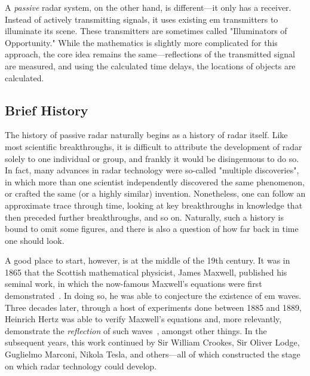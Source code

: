 \documentclass[class=report,11pt,crop=false]{standalone}
\begin{document}
A \emph{passive} radar system, on the other hand, is different---it only has a receiver. Instead of actively transmitting signals, it uses existing \gls{em} transmitters to illuminate its scene. These transmitters are sometimes called "Illuminators of Opportunity." While the mathematics is slightly more complicated for this approach, the core idea remains the same---reflections of the transmitted signal are measured, and using the calculated time delays, the locations of objects are calculated.

\subsection{Brief History}
The history of passive radar naturally begins as a history of radar itself. Like most scientific breakthroughs, it is difficult to attribute the development of radar solely to one individual or group, and frankly it would be disingenuous to do so. In fact, many advances in radar technology were so-called "multiple discoveries", in which more than one scientist independently discovered the same phenomenon, or crafted the same (or a highly similar) invention. Nonetheless, one can follow an approximate trace through time, looking at key breakthroughs in knowledge that then preceded further breakthroughs, and so on. Naturally, such a history is bound to omit some figures, and there is also a question of how far back in time one should look.

A good place to start, however, is at the middle of the 19th century. It was in 1865 that the Scottish mathematical physicist, James Maxwell, published his seminal work, in which the now-famous Maxwell's equations were first demonstrated~\cite{maxwell1865viii}. In doing so, he was able to conjecture the existence of \gls{em} waves. Three decades later, through a host of experiments done between 1885 and 1889, Heinrich Hertz was able to verify Maxwell's equations and, more relevantly, demonstrate the \emph{reflection} of such waves~\cite{hertz1893electromagnetic, Cichon1995}, amongst other things. In the subsequent years, this work continued by Sir William Crookes, Sir Oliver Lodge, Guglielmo Marconi, Nikola Tesla, and others---all of which constructed the stage on which radar technology could develop.
\end{document}
